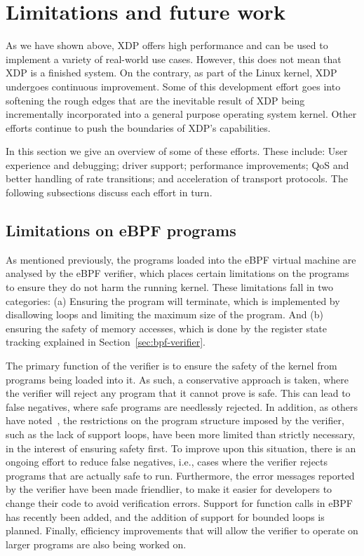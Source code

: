 \documentclass[sigconf]{acmart}
\begin{document}
\section{Limitations and future work}
\label{sec:limitations}
As we have shown above, XDP offers high performance and can be used to implement
a variety of real-world use cases. However, this does not mean that XDP is a
finished system. On the contrary, as part of the Linux kernel, XDP undergoes
continuous improvement. Some of this development effort goes into softening the
rough edges that are the inevitable result of XDP being incrementally
incorporated into a general purpose operating system kernel. Other efforts
continue to push the boundaries of XDP's capabilities.

In this section we give an overview of some of these efforts. These include:
User experience and debugging; driver support; performance improvements; QoS and
better handling of rate transitions; and acceleration of transport protocols.
The following subsections discuss each effort in turn.



\subsection{Limitations on eBPF programs}
\label{sec:limit-ebpf-progr}

As mentioned previously, the programs loaded into the eBPF virtual machine are
analysed by the eBPF verifier, which places certain limitations on the programs
to ensure they do not harm the running kernel. These limitations fall in two
categories: (a) Ensuring the program will terminate, which is implemented by
disallowing loops and limiting the maximum size of the program. And (b) ensuring
the safety of memory accesses, which is done by the register state tracking
explained in Section~\ref{sec:bpf-verifier}.

The primary function of the verifier is to ensure the safety of the kernel from
programs being loaded into it. As such, a conservative approach is taken, where
the verifier will reject any program that it cannot prove is safe. This can lead
to false negatives, where safe programs are needlessly rejected. In addition, as
others have noted~\cite{miano2018creating}, the restrictions on the program
structure imposed by the verifier, such as the lack of support loops, have been
more limited than strictly necessary, in the interest of ensuring safety first.
To improve upon this situation, there is an ongoing effort to reduce false
negatives, i.e., cases where the verifier rejects programs that are actually
safe to run. Furthermore, the error messages reported by the verifier have been
made friendlier, to make it easier for developers to change their code to avoid
verification errors. Support for function calls in eBPF has recently been added,
and the addition of support for bounded loops is planned. Finally, efficiency
improvements that will allow the verifier to operate on larger programs are also
being worked on.
\end{document}

